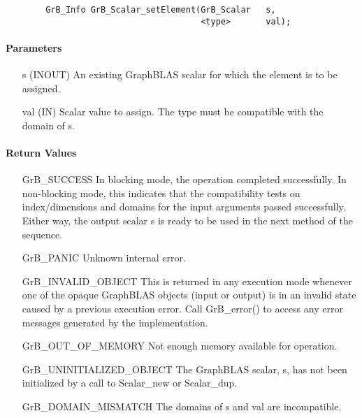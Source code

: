 \begin{verbatim}
        GrB_Info GrB_Scalar_setElement(GrB_Scalar   s,
                                       <type>       val);
\end{verbatim}

\paragraph{Parameters}

\begin{itemize}[leftmargin=1.1in]
    \item[{\sf s}]   ({\sf INOUT}) An existing GraphBLAS scalar for which the 
    element is to be assigned.

    \item[{\sf val}]   ({\sf IN}) Scalar value to assign.  The type must
    be compatible with the domain of {\sf s}.
\end{itemize}

\paragraph{Return Values}

\begin{itemize}[leftmargin=2.1in]
    \item[{\sf GrB\_SUCCESS}]         In blocking mode, the operation completed
    successfully. In non-blocking mode, this indicates that the compatibility 
    tests on index/dimensions and domains for the input arguments passed successfully. 
    Either way, the output scalar {\sf s} is ready to be used in the next method of 
    the sequence.

    \item[{\sf GrB\_PANIC}]   Unknown internal error.
    
    \item[{\sf GrB\_INVALID\_OBJECT}] This is returned in any execution mode 
    whenever one of the opaque GraphBLAS objects (input or output) is in an invalid 
    state caused by a previous execution error.  Call {\sf GrB\_error()} to access 
    any error messages generated by the implementation.

    \item[{\sf GrB\_OUT\_OF\_MEMORY}]  Not enough memory available for operation.
    
    \item[{\sf GrB\_UNINITIALIZED\_OBJECT}]  The GraphBLAS scalar, {\sf s}, has 
    not been initialized by a call to {\sf Scalar\_new} or {\sf Scalar\_dup}.
    
    \item[{\sf GrB\_DOMAIN\_MISMATCH}]     The domains of {\sf s} and {\sf val}
    are incompatible.
\end{itemize}

